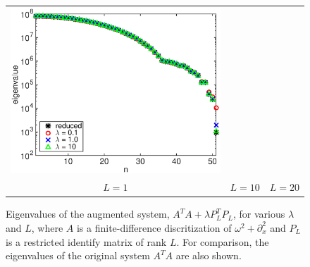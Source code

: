 \documentclass{iopart}
\begin{document}
\begin{figure}
\begin{tabular}{ccc}
\includegraphics[scale=.2]{./figs/example3_c}\\
{\small $L = 1$}&{\small $L = 10$}&{\small $L = 20$}\\
\end{tabular}
\caption{Eigenvalues of the augmented system,  $A^T\!A + \lambda P_L^T\!P_L$, for various $\lambda$ and $L$, where $A$ is a finite-difference discritization of $\omega^2 + \partial_x^2$
and $P_L$ is a restricted identify matrix of rank $L$. For comparison, the eigenvalues of the original system $A^T\!A$ are also shown.}
\label{fig:example3}
\end{figure}
\end{document}
